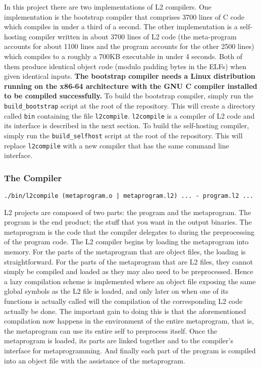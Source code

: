 \documentclass[]{article}
\begin{document}
In this project there are two implementations of L2 compilers. One
implementation is the bootstrap compiler that comprises 3700 lines of C
code which compiles in under a third of a second. The other
implementation is a self-hosting compiler written in about 3700 lines of
L2 code (the meta-program accounts for about 1100 lines and the program
accounts for the other 2500 lines) which compiles to a roughly a 700KB
executable in under 4 seconds. Both of them produce identical object
code (modulo padding bytes in the ELFs) when given identical inputs.
\textbf{The bootstrap compiler needs a Linux distribution running on the
x86-64 architecture with the GNU C compiler installed to be compiled
successfully.} To build the bootstrap compiler, simply run the
\texttt{build\_bootstrap} script at the root of the repository. This
will create a directory called \texttt{bin} containing the file
\texttt{l2compile}. \texttt{l2compile} is a compiler of L2 code and its
interface is described in the next section. To build the self-hosting
compiler, simply run the \texttt{build\_selfhost} script at the root of
the repository. This will replace \texttt{l2compile} with a new compiler
that has the same command line interface.

\hypertarget{the-compiler}{\subsubsection{The
Compiler}\label{the-compiler}}

\begin{verbatim}
./bin/l2compile (metaprogram.o | metaprogram.l2) ... - program.l2 ...
\end{verbatim}

L2 projects are composed of two parts: the program and the metaprogram.
The program is the end product; the stuff that you want in the output
binaries. The metaprogram is the code that the compiler delegates to
during the preprocessing of the program code. The L2 compiler begins by
loading the metaprogram into memory. For the parts of the metaprogram
that are object files, the loading is straightforward. For the parts of
the metaprogram that are L2 files, they cannot simply be compiled and
loaded as they may also need to be preprocessed. Hence a lazy
compilation scheme is implemented where an object file exposing the same
global symbols as the L2 file is loaded, and only later on when one of
its functions is actually called will the compilation of the
corresponding L2 code actually be done. The important gain to doing this
is that the aforementioned compilation now happens in the environment of
the entire metaprogram, that is, the metaprogram can use its entire self
to preprocess itself. Once the metaprogram is loaded, its parts are
linked together and to the compiler's interface for metaprogramming. And
finally each part of the program is compiled into an object file with
the assistance of the metaprogram.
\end{document}
